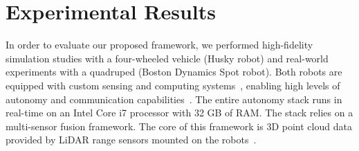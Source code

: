 \documentclass[letterpaper]{article} %
\newcommand{\ph}[1]{{\textbf{#1}:}} %
\newcommand{\ncomment}[1]{}
\begin{document}
%
%





\section{Experimental Results}\label{sec:exp_results}
In order to evaluate our proposed framework, we performed high-fidelity simulation studies with a four-wheeled vehicle (Husky robot) and real-world experiments with a quadruped (Boston Dynamics Spot robot). Both robots are equipped with custom sensing and computing systems~\cite{AutoSpot}, enabling high levels of autonomy and communication capabilities~\cite{Otsu2020}. The entire autonomy stack runs in real-time on an Intel Core i7 processor with 32 GB of RAM. The stack relies on a multi-sensor fusion framework. The core of this framework is 3D point cloud data provided by LiDAR range sensors mounted on the robots~\cite{Ebadi2020}.

\end{document}

